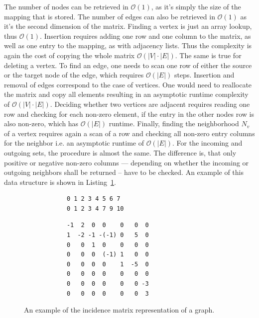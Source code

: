             The number of nodes can be retrieved in $\mathcal{O}(1)$, as it's simply the size of the mapping that is stored.
            The number of edges can also be retrieved in $\mathcal{O}(1)$ as it's the second dimension of the matrix.
            Finding a vertex is just an array lookup, thus $\mathcal{O}(1)$.
            Insertion requires adding one row and one column to the matrix, as well as one entry to the mapping, as with adjacency lists. 
            Thus the complexity is again the cost of copying the whole matrix $\mathcal{O}(|V| \cdot |E|)$. 
            The same is true for deleting a vertex.         
            To find an edge, one needs to scan one row of either the source or the target node of the edge, which requires $\mathcal{O}(|E|)$ steps.
            Insertion and removal of edges correspond to the case of vertices.
            One would need to reallocate the matrix and copy all elements resulting in an asymptotic runtime complexity of $\mathcal{O}(|V| \cdot |E|)$. 
            Deciding whether two vertices are adjacent requires reading one row and checking for each non-zero element, if the entry in the other nodes row is also non-zero, which has $\mathcal{O}(|E|)$ runtime.        
            Finally, finding the neighborhood $N_v$ of a vertex requires again a scan of a row and checking all non-zero entry columns for the neighbor i.e. an asymptotic runtime of $\mathcal{O}(|E|)$. 
            For the incoming and outgoing sets, the procedure is almost the same. 
            The difference is, that only positive or negative non-zero columns --- depending on whether the incoming or outgoing neighbors shall be returned -- have to be checked.
            An example of this data structure is shown in Listing~\ref{incm}.
        
        \begin{figure}[htp]
         \begin{center}
         \begin{verbatim}
            0 1 2 3 4 5 6 7
            0 1 2 3 4 7 9 10
          \end{verbatim}
          \begin{verbatim}
            -1  2  0  0    0   0  0
            1  -2 -1 -(-1) 0   5  0
            0   0  1  0    0   0  0
            0   0  0  (-1) 1   0  0
            0   0  0  0    1  -5  0
            0   0  0  0    0   0  0
            0   0  0  0    0   0 -3
            0   0  0  0    0   0  3
          \end{verbatim}
         \end{center}
         \caption{An example of the incidence matrix representation of a graph.}
         \label{incm}
        \end{figure}
        
